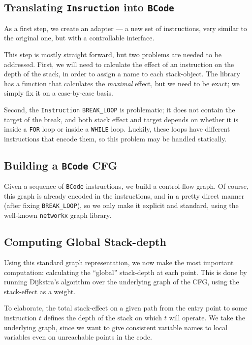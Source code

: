 \documentclass[a4paper]{article}
\begin{document}
\subsection{Translating \texttt{Insruction} into \texttt{BCode}}

As a first step, we create an adapter --- a new set of instructions, very similar to the original one, but with a controllable interface.

This step is mostly straight forward, but two problems are needed to be addressed. First, we will need to calculate the effect of an instruction on the depth of the stack, in order to assign a name to each stack-object. The library has a function that calculates the \textit{maximal} effect, but we need to be exact; we simply fix it on a case-by-case basis.

Second, the \texttt{Instruction} \texttt{BREAK\_LOOP} is problematic; it does not contain the target of the break, and both stack effect and target depends on whether it is inside a \texttt{FOR} loop or inside a \texttt{WHILE} loop. Luckily, these loops have different instructions that encode them, so this problem may be handled statically.

\subsection{Building a \texttt{BCode} CFG}

Given a sequence of \texttt{BCode} instructions, we build a control-flow graph. Of course, this graph is already encoded in the instructions, and in a pretty direct manner (after fixing \texttt{BREAK\_LOOP}), so we only make it explicit and standard, using the well-known \texttt{networkx} graph library.

\subsection{Computing Global Stack-depth}

Using this standard graph representation, we now make the most important computation: calculating the ``global'' stack-depth at each point. This is done by running Dijkstra's algorithm over the underlying graph of the CFG, using the stack-effect as a weight.

To elaborate, the total stack-effect on a given path from the entry point to some instruction $t$ defines the depth of the stack on which $t$ will operate. We take the underlying graph, since we want to give consistent variable names to local variables even on unreachable points in the code.
\end{document}
